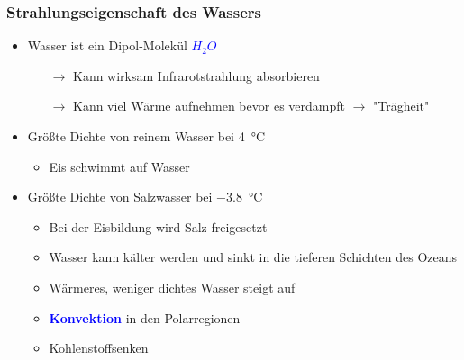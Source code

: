 \begin{frame}
	\frametitle{Strahlungseigenschaft des Wassers} %
	\begin{itemize}
		\item Wasser ist ein Dipol-Molekül \textcolor{blue}{$H_2O$}
		\begin{itemize}			
			\item[$\rightarrow$] Kann wirksam Infrarotstrahlung absorbieren
			\item[$\rightarrow$] Kann viel Wärme aufnehmen bevor es verdampft $\rightarrow$ "Trägheit"
		\end{itemize}
		
		\item<3-> Größte Dichte von reinem Wasser bei \SI{4}{\degreeCelsius}
		\begin{itemize}
			\item<2->[$\rightarrow$] Eis schwimmt auf Wasser
		\end{itemize}		
		\item<5->Größte Dichte von Salzwasser bei \SI{-3,8}{\degreeCelsius}
		\begin{itemize}
			\item<3-> [] Bei der Eisbildung wird Salz freigesetzt
			\item<3-> [$\rightarrow$] Wasser kann kälter werden und sinkt in die tieferen Schichten des Ozeans
			\item<3-> [$\rightarrow$] Wärmeres, weniger dichtes Wasser steigt auf
			\item<3-> [] \textbf{\textcolor{blue}{Konvektion}} in den Polarregionen 
			\item<3-> [$\rightarrow$] Kohlenstoffsenken
		\end{itemize}
	\end{itemize}


\end{frame}

